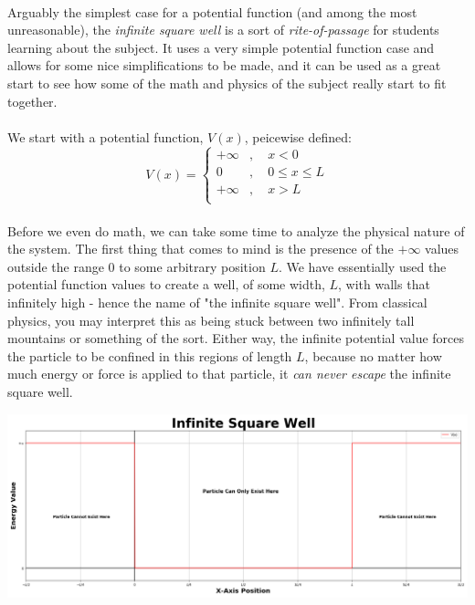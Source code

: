 \documentclass[12pt,letterpaper]{book}
\begin{document}
\paragraph*{}Arguably the simplest case for a potential function (and among the most unreasonable), the \textit{infinite square well} is a sort of \textit{rite-of-passage} for students learning about the subject. It uses a very simple potential function case and allows for some nice simplifications to be made, and it can be used as a great start to see how some of the math and physics of the subject really start to fit together.
\paragraph*{}We start with a potential function, $V(x)$, peicewise defined:
\begin{equation}
\label{ISW potential}
V(x) = \left\{
        \begin{array}{ll}
            +\infty &, \quad x < 0 \\
            0 		&, \quad 0 \leq x \leq L \\
            +\infty &, \quad x > L \\
        \end{array}
    \right.
\end{equation}
\paragraph*{}Before we even do math, we can take some time to analyze the physical nature of the system. The first thing that comes to mind is the presence of the $+\infty$ values outside the range $0$ to some arbitrary position $L$. We have essentially used the potential function values to create a well, of some width, $L$, with walls that infinitely high - hence the name of "the infinite square well". From classical physics, you may interpret this as being stuck between two infinitely tall mountains or something of the sort. Either way, the infinite potential value forces the particle to be confined in this regions of length $L$, because no matter how much energy or force is applied to that particle, it \textit{can never escape} the infinite square well.
\begin{center}
\includegraphics[scale=0.32]{ISW}
\end{center}
\end{document}
